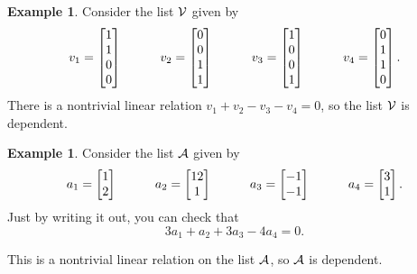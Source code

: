 \documentclass[reqno]{amsart}
\theoremstyle{definition}
\newtheorem{example}[theorem]{Example}
\begin{document}
\begin{example}\label{eg-dep-i}
 Consider the list $\mathcal{V}$ given by
 \[ v_1 = \left[\begin{matrix} 1 \\ 1 \\ 0 \\ 0 \end{matrix}\right] \hspace{3em}
    v_2 = \left[\begin{matrix} 0 \\ 0 \\ 1 \\ 1 \end{matrix}\right] \hspace{3em}
    v_3 = \left[\begin{matrix} 1 \\ 0 \\ 0 \\ 1 \end{matrix}\right] \hspace{3em}
    v_4 = \left[\begin{matrix} 0 \\ 1 \\ 1 \\ 0 \end{matrix}\right].
 \]
 There is a nontrivial linear relation $v_1+v_2-v_3-v_4=0$, so the
 list $\mathcal{V}$ is dependent.
\end{example}
\begin{example}\label{eg-dep-ii}
 Consider the list $\mathcal{A}$ given by
 \[ a_1 = \left[\begin{matrix}  1 \\  2 \end{matrix}\right] \hspace{3em}
    a_2 = \left[\begin{matrix} 12 \\  1 \end{matrix}\right] \hspace{3em}
    a_3 = \left[\begin{matrix} -1 \\ -1 \end{matrix}\right] \hspace{3em}
    a_4 = \left[\begin{matrix}  3 \\  1 \end{matrix}\right].
 \]
 Just by writing it out, you can check that
 \[ 3a_1 + a_2 + 3a_3 -4a_4 = 0. \]
 \begin{center}
 \end{center}
 This is a nontrivial linear relation on the list $\mathcal{A}$, so $\mathcal{A}$ is
 dependent.
\end{example}
\end{document}
